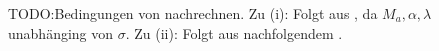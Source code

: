 \begin{Beweis}
TODO:\@ Bedingungen von  nachrechnen.
Zu (i): Folgt aus , da $M_{a}, \alpha, \lambda$ unabhänging von $\sigma$.
Zu (ii): Folgt aus nachfolgendem .
\end{Beweis}


